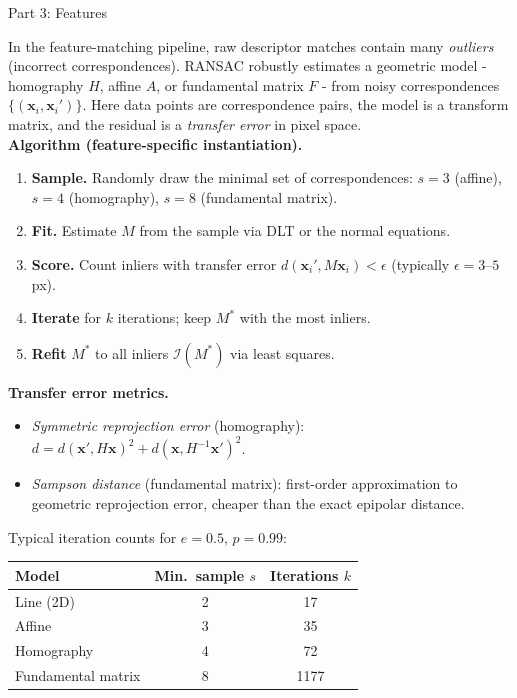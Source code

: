 \documentclass[letterpaper]{article}
\begin{document}
\begin{notes}{Part 3: Features}

In the feature-matching pipeline, raw descriptor matches contain many \emph{outliers} (incorrect correspondences). RANSAC robustly estimates a geometric model - homography $H$, affine $A$, or fundamental matrix $F$ - from noisy correspondences $\{(\mathbf{x}_i, \mathbf{x}_i')\}$. Here data points are correspondence pairs, the model is a transform matrix, and the residual is a \emph{transfer error} in pixel space.\\

\textbf{Algorithm (feature-specific instantiation).}
\begin{enumerate}
    \item \textbf{Sample.} Randomly draw the minimal set of correspondences: $s=3$ (affine), $s=4$ (homography), $s=8$ (fundamental matrix).
    \item \textbf{Fit.} Estimate $M$ from the sample via DLT or the normal equations.
    \item \textbf{Score.} Count inliers with transfer error $d(\mathbf{x}_i', M\mathbf{x}_i) < \epsilon$ (typically $\epsilon = 3$–$5$ px).
    \item \textbf{Iterate} for $k$ iterations; keep $M^*$ with the most inliers.
    \item \textbf{Refit} $M^*$ to all inliers $\mathcal{I}(M^*)$ via least squares.
\end{enumerate}

\textbf{Transfer error metrics.}
\begin{itemize}
    \item \emph{Symmetric reprojection error} (homography): $d = d(\mathbf{x}',H\mathbf{x})^2 + d(\mathbf{x},H^{-1}\mathbf{x}')^2$.
    \item \emph{Sampson distance} (fundamental matrix): first-order approximation to geometric reprojection error, cheaper than the exact epipolar distance.
\end{itemize}

Typical iteration counts for $e=0.5$, $p=0.99$:

\begin{center}
\begin{tabular}{lcc}
\hline
\textbf{Model} & \textbf{Min.\ sample} $s$ & \textbf{Iterations} $k$ \\
\hline
Line (2D) & 2 & 17 \\
Affine & 3 & 35 \\
Homography & 4 & 72 \\
Fundamental matrix & 8 & 1177 \\
\hline
\end{tabular}
\end{center}


\end{notes}
\end{document}
